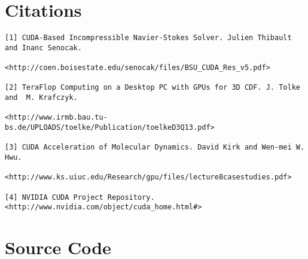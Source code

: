 \documentclass[10pt]{article}
\begin{document}
\section{Citations}
\begin{verbatim}
[1] CUDA-Based Incompressible Navier-Stokes Solver. Julien Thibault and Inanc Senocak.

<http://coen.boisestate.edu/senocak/files/BSU_CUDA_Res_v5.pdf>

[2] TeraFlop Computing on a Desktop PC with GPUs for 3D CDF. J. Tolke and  M. Krafczyk.  

<http://www.irmb.bau.tu-bs.de/UPLOADS/toelke/Publication/toelkeD3Q13.pdf>

[3] CUDA Acceleration of Molecular Dynamics. David Kirk and Wen-mei W. Hwu.  

<http://www.ks.uiuc.edu/Research/gpu/files/lecture8casestudies.pdf>

[4] NVIDIA CUDA Project Repository. <http://www.nvidia.com/object/cuda_home.html#>
\end{verbatim}

\appendix
\section{Source Code}
\end{document}
